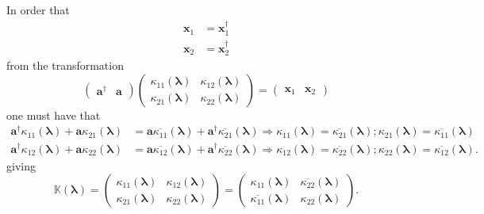 \documentclass[aps, preprint]{revtex4}
\begin{document}
In order that
\begin{align}\mathbf{x}_{1} &  =\mathbf{x}_{1}^{ \dag } \\
\mathbf{x}_{2} &  =\mathbf{x}_{2}^{ \dag }\end{align}from the transformation
\begin{equation}\left (\begin{array}{cc}\mathbf{a}^{ \dag } & \mathbf{a}\end{array}\right ) \left (\begin{array}{cc}\kappa _{1 1} \left (\mathbf{\lambda }\right ) & \kappa _{1 2} \left (\mathbf{\lambda }\right ) \\
\kappa _{2 1} \left (\mathbf{\lambda }\right ) & \kappa _{2 2} \left (\mathbf{\lambda }\right )\end{array}\right ) =\left (\begin{array}{cc}\mathbf{x}_{1} & \mathbf{x}_{2}\end{array}\right )
\end{equation}one must have that
\begin{align}\mathbf{a}^{ \dag } \kappa _{1 1} \left (\mathbf{\lambda }\right ) +\mathbf{a} \kappa _{2 1} \left (\mathbf{\lambda }\right ) &  =\mathbf{a} \overline{\kappa _{1 1}} \left (\mathbf{\lambda }\right ) +\mathbf{a}^{ \dag } \overline{\kappa _{2 1}} \left (\mathbf{\lambda }\right ) \Rightarrow \kappa _{1 1} \left (\mathbf{\lambda }\right ) =\overline{\kappa _{2 1}} \left (\mathbf{\lambda }\right ) ;\kappa _{2 1} \left (\mathbf{\lambda }\right ) =\overline{\kappa _{1 1}} \left (\mathbf{\lambda }\right ) \\
\mathbf{a}^{ \dag } \kappa _{1 2} \left (\mathbf{\lambda }\right ) +\mathbf{a} \kappa _{2 2} \left (\mathbf{\lambda }\right ) &  =\mathbf{a} \overline{\kappa _{1 2}} \left (\mathbf{\lambda }\right ) +\mathbf{a}^{ \dag } \overline{\kappa _{2 2}} \left (\mathbf{\lambda }\right ) \Rightarrow \kappa _{1 2} \left (\mathbf{\lambda }\right ) =\overline{\kappa _{2 2}} \left (\mathbf{\lambda }\right ) ;\kappa _{2 2} \left (\mathbf{\lambda }\right ) =\overline{\kappa _{1 2}} \left (\mathbf{\lambda }\right )\text{.}\end{align}giving
\begin{equation}\mathbb{K} \left (\mathbf{\lambda }\right ) =\left (\begin{array}{cc}\kappa _{1 1} \left (\mathbf{\lambda }\right ) & \kappa _{1 2} \left (\mathbf{\lambda }\right ) \\
\kappa _{2 1} \left (\mathbf{\lambda }\right ) & \kappa _{2 2} \left (\mathbf{\lambda }\right )\end{array}\right ) =\left (\begin{array}{cc}\kappa _{1 1} \left (\mathbf{\lambda }\right ) & \overline{\kappa _{2 2}} \left (\mathbf{\lambda }\right ) \\
\overline{\kappa _{1 1}} \left (\mathbf{\lambda }\right ) & \kappa _{2 2} \left (\mathbf{\lambda }\right )\end{array}\right )\text{.}
\end{equation}
\end{document}
